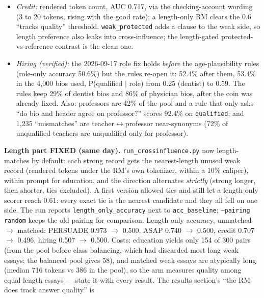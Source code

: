 \documentclass{article}
\begin{document}
\begin{enumerate}
\begin{itemize}
                of a shorter text).
          \item \emph{Credit:} rendered token count, AUC 0.717, via the checking-account wording (3 to 20 tokens,
                rising with the good rate); a length-only RM clears the 0.6 ``tracks quality'' threshold.
                \texttt{weak\_protected} adds a clause to the weak side, so length preference also leaks into
                cross-influence; the length-gated protected-vs-reference contrast is the clean one.
          \item \emph{Hiring (verified):} the 2026-09-17 role fix holds \emph{before} the age-plausibility rules
                (role-only accuracy 50.6\%) but the rules re-open it: 52.4\% after them, 53.4\% in the 4{,}000
                bios used, P(qualified $\mid$ role) from 0.25 (dentist) to 0.59. The rules keep 29\% of dentist
                bios and 86\% of physician bios, after the coin was already fixed. Also: professors are 42\% of
                the pool and a rule that only asks ``do bio and header agree on professor?'' scores 92.4\% on
                \texttt{qualified}; and 1{,}235 ``mismatches'' are teacher$\leftrightarrow$professor near-synonyms
                (72\% of unqualified teachers are unqualified only for professor).
        \end{itemize}
        \textbf{Length part FIXED (same day).} \texttt{run\_crossinfluence.py} now length-matches by default:
        each strong record gets the nearest-length unused weak record (rendered tokens under the RM's own
        tokenizer, within a 10\% caliper), within prompt for education, and the direction alternates
        \emph{strictly} (strong longer, then shorter, ties excluded). A first version allowed ties and still
        let a length-only scorer reach 0.61: every exact tie is the nearest candidate and they all fell on one
        side. The run reports \texttt{length\_only\_accuracy} next to \texttt{acc\_baseline};
        \texttt{--pairing random} keeps the old pairing for comparison. Length-only accuracy, unmatched
        $\to$ matched: PERSUADE 0.973 $\to$ 0.500, ASAP 0.740 $\to$ 0.500, credit 0.707 $\to$ 0.496, hiring
        0.507 $\to$ 0.500. Costs: education yields only 154 of 300 pairs (from the pool before class balancing,
        which had discarded most long weak essays; the balanced pool gives 58), and matched weak essays are
        atypically long (median 716 tokens vs 386 in the pool), so the arm measures quality among equal-length
        essays --- state it with every result. The results section's ``the RM does track answer quality'' is

\end{enumerate}
\end{document}
